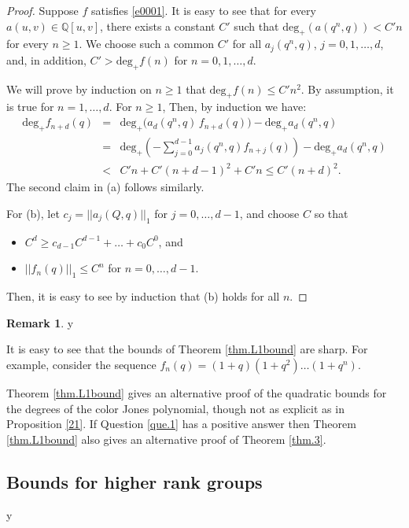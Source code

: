 \documentclass{amsart}
\theoremstyle{definition}
\newtheorem{remark}[theorem]{Remark}
\def\printname#1{
    \if\draft y
        \smash{\makebox[0pt]{\hspace{-0.5in}
            \raisebox{8pt}{\tt\tiny #1}}}
    \fi
}
\def\lbl#1{\label{#1}\printname{#1}}
\def\BQ{\mathbb Q}
\def\maxdeg{\mathrm{deg}_+}
\def\deg{\mathrm{deg}}
\begin{document}
\begin{proof}
Suppose $f$ satisfies \eqref{e0001}.
It is easy to see that for every $a(u,v)\in \BQ[u,v]$, there exists a 
constant $C'$ such that $\deg_+(a(q^n,q)) < C' n $  for every $n \ge 1$. 
We choose such a common $C'$ for  all
$a_j(q^n,q)$, $j=0,1,\dots,d$, and, in addition,  $C' > \maxdeg f(n)$ for 
$n=0, 1,\dots,d$.

We will prove by induction on $n\ge 1 $ that $\maxdeg f(n) \leq C' n^2$.
By assumption, it is true for $n=1, \dots, d$. For $n \ge 1$,
Then, by induction we have:
\begin{eqnarray*}
\maxdeg  f_{n+d}(q) & = &
\maxdeg \Big(  a_d(q^n,q) \, f_{n+d}(q)\Big) - \maxdeg  a_d(q^n,q) \\
&=& \maxdeg  \left(-\sum_{j=0}^{d-1} a_j(q^n,q) f_{n+j}(q)\right)   - \maxdeg  
a_d(q^n,q) \\
&< & C'n + C'(n+d-1)^2 + C'n \le C'(n+d)^2.
\end{eqnarray*}
The second claim in (a) follows similarly.

For (b), let $c_j=||a_j(Q,q)||_1$ for $j=0, \dots, d-1$, and choose $C$
so that
\begin{itemize}
\item
$C^d \geq c_{d-1} C^{d-1} + \dots + c_0 C^0$, and
\item
$||f_n(q)||_1 \leq C^n$ for $n=0, \dots, d-1$.
\end{itemize}
Then, it is easy to see by induction that (b) holds for all $n$.
\end{proof}


\begin{remark}
\lbl{rem.holosharp}
It is easy to see that the bounds of Theorem \ref{thm.L1bound} are sharp.
For example,
consider the sequence $f_n(q)=(1+q)(1+q^2)\dots(1+q^n)$.
\end{remark}


 Theorem \ref{thm.L1bound} gives an alternative proof of the quadratic bounds for the degrees of the color Jones polynomial, though not as
 explicit as in
Proposition \ref{21}.  If Question
\ref{que.1} has a positive answer then Theorem \ref{thm.L1bound} also gives an alternative proof of Theorem \ref{thm.3}.



\subsection{Bounds for higher rank groups}
\lbl{sub.high}
\end{document}
